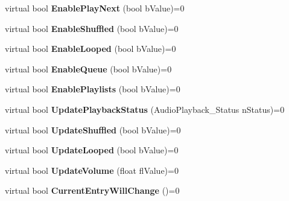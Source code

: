 \begin{DoxyCompactItemize}
virtual bool {\bfseries Enable\+Play\+Next} (bool b\+Value)=0
\item 
\mbox{\label{class_i_steam_music_remote_a48dcbe69e77efa913624b26c654256ef}} 
virtual bool {\bfseries Enable\+Shuffled} (bool b\+Value)=0
\item 
\mbox{\label{class_i_steam_music_remote_af6ffe656e7df55b68ca30dee92e34821}} 
virtual bool {\bfseries Enable\+Looped} (bool b\+Value)=0
\item 
\mbox{\label{class_i_steam_music_remote_a2030411db796caadd0aafa95a3ce2ca5}} 
virtual bool {\bfseries Enable\+Queue} (bool b\+Value)=0
\item 
\mbox{\label{class_i_steam_music_remote_aeeb69334d1e124e352e88ca49537b271}} 
virtual bool {\bfseries Enable\+Playlists} (bool b\+Value)=0
\item 
\mbox{\label{class_i_steam_music_remote_a4a02fc3680d7be1182970db57541221a}} 
virtual bool {\bfseries Update\+Playback\+Status} (Audio\+Playback\+\_\+\+Status n\+Status)=0
\item 
\mbox{\label{class_i_steam_music_remote_a082c05e472d7255182be20ee13391de6}} 
virtual bool {\bfseries Update\+Shuffled} (bool b\+Value)=0
\item 
\mbox{\label{class_i_steam_music_remote_a1a5599ba3f6197966a76aeb369eaee25}} 
virtual bool {\bfseries Update\+Looped} (bool b\+Value)=0
\item 
\mbox{\label{class_i_steam_music_remote_ac00efc05660358734af6e46a80b76631}} 
virtual bool {\bfseries Update\+Volume} (float fl\+Value)=0
\item 
\mbox{\label{class_i_steam_music_remote_ac1ca31126dd70e9da84e61dff1f2ba97}} 
virtual bool {\bfseries Current\+Entry\+Will\+Change} ()=0
\item 
\mbox{\label{class_i_steam_music_remote_a4a54354f3968b4ffc61613582e158486}} 

\end{DoxyCompactItemize}
